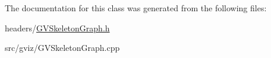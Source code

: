 The documentation for this class was generated from the following files\+:\begin{DoxyCompactItemize}
\item 
headers/\hyperlink{GVSkeletonGraph_8h}{G\+V\+Skeleton\+Graph.\+h}\item 
src/gviz/G\+V\+Skeleton\+Graph.\+cpp\end{DoxyCompactItemize}
